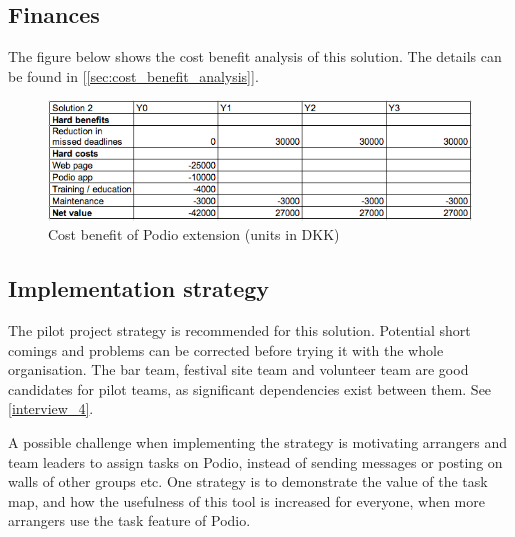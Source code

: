 \subsection{Finances}
The figure below shows the cost benefit analysis of this solution. The details can be found in [\ref{sec:cost_benefit_analysis}].
\begin{figure}[h!]
  \centering
\includegraphics[scale=0.5]{Pictures/cost-benefit2.png}
    \caption{Cost benefit of Podio extension (units in DKK)}
\end{figure}

\subsection{Implementation strategy}
The pilot project strategy is recommended for this solution. Potential short comings and problems
can be corrected before trying it with the whole organisation. The bar team, festival site team and
volunteer team are good candidates for pilot teams, as significant dependencies exist between them.
See \ref{interview_4}.


A possible challenge when implementing the strategy is motivating arrangers and team leaders to assign tasks on Podio, instead of sending messages or posting on walls of other groups etc. One strategy is to demonstrate the value of the task map, and how the usefulness of this tool is increased for everyone, when more arrangers use the task feature of Podio.


